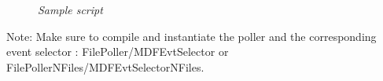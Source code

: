 \begin{figure}
\caption{\textit{Sample script}}
\centering
{}\par
\end{figure}\par

Note: Make sure to compile and instantiate the poller and the corresponding event selector : FilePoller/MDFEvtSelector or FilePollerNFiles/MDFEvtSelectorNFiles.\par

\newpage

